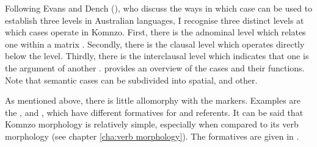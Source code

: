 Following Evans and Dench (\citeyear{Evans:1988ge}), who discuss the ways in which case can be used to establish three levels in Australian languages, I recognise three distinct levels at which cases operate in Komnzo. First, there is the adnominal level which relates one  within a matrix . Secondly, there is the clausal level which operates directly below the  level. Thirdly, there is the interclausal level which indicates that one  is the argument of another .  provides an overview of the cases and their functions. Note that semantic cases can be subdivided into spatial,  and other.

As mentioned above, there is little allomorphy with the  markers. Examples are the ,  and  , which have different formatives for  and  referents. It can be said that Komnzo  morphology is relatively simple, especially when compared to its verb morphology (see chapter \ref{cha:verb morphology}). The formatives are given in . 

